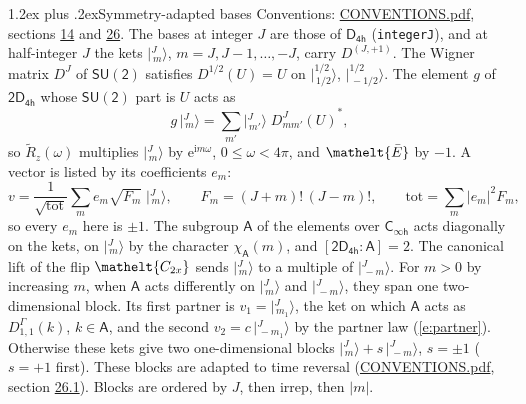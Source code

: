\documentclass[10pt,a4paper]{article}
\makeatletter
\renewcommand\section{\@startsection{section}{1}{\z@}{-3ex plus -1ex minus -.2ex}%
  {1.2ex plus .2ex}{\normalfont\large\sffamily\bfseries\color{parttitle}}}
\numberwithin{equation}{section}
\newcommand{\eltfont}[1]{{\let\sigma\eltsigma\mathelt{#1}}}
\newcommand{\grp}[1]{\mathsf{#1}}
\newcommand{\elt}[1]{\eltfont{#1}}
\newcommand{\grpindex}[2]{[#1 : #2]}
\newcommand{\iunit}{\mathrm{i}}
\newcommand{\expe}{\mathrm{e}}
\newcommand{\irrJp}[2]{D^{(#1,#2)}}
\newcommand{\repD}[1]{D^{#1}}
\newcommand{\wignerD}[1]{D^{#1}}
\newcommand{\chiA}{\chi_{\grp{A}}}
\newcommand{\conj}[1]{{#1}^{*}}
\newcommand{\jm}[2]{\bigl\lvert{}^{#1}_{\,#2}\bigr\rangle}
\newcommand{\barred}[1]{\bar{#1}}
\newcommand{\lift}[1]{\tilde{#1}}
\makeatother
\begin{document}
\section{Symmetry-adapted bases}\label{s:bases}
Conventions: \href{../../CONVENTIONS.pdf}{CONVENTIONS.pdf}, sections \href{../../../rotation/CONVENTIONS.pdf\#conv.14}{14} and \href{../../CONVENTIONS.pdf\#conv.26}{26}.
\leavevmode\label{n:index.m}\label{n:vector.ket}The bases at integer $J$ are those of \href{../../../rotation/data/pdf/D4h.pdf}{$\grp{D_{4h}}$} (\texttt{integerJ}), and at half-integer $J$ the kets $\jm{J}{m}$, $m = J, J-1, \dots, -J$, carry $\irrJp{J}{+1}$. \label{n:matrix.wigner}The Wigner matrix $\wignerD{J}$ of $\grp{SU(2)}$ satisfies $\wignerD{1/2}(U) = U$ on $\jm{1/2}{1/2}$, $\jm{1/2}{-1/2}$. The element $g$ of $\grp{2D_{4h}}$ whose $\grp{SU(2)}$ part is $U$ acts as
\begin{equation}\label{e:action}g\,\jm{J}{m} = \sum_{m'} \jm{J}{m'}\; \conj{\wignerD{J}_{m m'}(U)},\end{equation}
so $\lift{R}_{z}(\omega)$ multiplies $\jm{J}{m}$ by $\expe^{\iunit m\omega}$, $0 \le \omega < 4\pi$, and $\elt{\barred{E}}$ by $-1$. \label{n:index.ketcoefficient}\label{n:vector.basis.symmetry}\label{n:index.ketweight}\label{n:index.total}A vector is listed by its coefficients $e_m$:
\begin{equation}\label{e:ket}v = \frac{1}{\sqrt{\mathrm{tot}}}\sum_m e_m\sqrt{F_m}\;\jm{J}{m},\qquad F_m = (J+m)!\,(J-m)!,\qquad \mathrm{tot} = \sum_m |e_m|^2F_m,\end{equation}
so every $e_m$ here is $\pm 1$.
\leavevmode\label{n:group.A}\label{n:function.character.abelian}The subgroup $\grp{A}$ of the elements over $\grp{C_{\infty h}}$ acts diagonally on the kets, on $\jm{J}{m}$ by the character $\chiA(m)$, and $\grpindex{\grp{2D_{4h}}}{\grp{A}} = 2$. The canonical lift of the flip $\elt{C_{2x}}$ sends $\jm{J}{m}$ to a multiple of $\jm{J}{-m}$. For $m > 0$ by increasing $m$, when $\grp{A}$ acts differently on $\jm{J}{m}$ and $\jm{J}{-m}$, they span one two-dimensional block. \label{n:index.partner.sign}Its first partner is $v_1 = \jm{J}{m_1}$, the ket on which $\grp{A}$ acts as $\repD{\Gamma}_{1,1}(k)$, $k \in \grp{A}$, and the second $v_2 = c\,\jm{J}{-m_1}$ by the partner law (\ref{e:partner}). \label{n:index.pair.sign}Otherwise these kets give two one-dimensional blocks $\jm{J}{m} + s\,\jm{J}{-m}$, $s = \pm 1$ ($s = +1$ first). These blocks are adapted to time reversal (\href{../../CONVENTIONS.pdf}{CONVENTIONS.pdf}, section \href{../../CONVENTIONS.pdf\#conv.26.1}{26.1}). Blocks are ordered by $J$, then irrep, then $|m|$.
\end{document}
